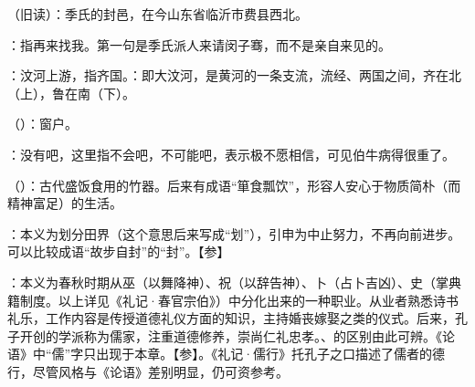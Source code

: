 {
\item {}（旧读）：季氏的封邑，在今山东省临沂市费县西北。%
\item {}：指再来找我。第一句是季氏派人来请闵子骞，而不是亲自来见的。

\item {}：汶河上游，指齐国。：即大汶河，是黄河的一条支流，流经、两国之间，齐在北（上），鲁在南（下）。
}
{}


{
\item {}（）：窗户。
\item {}：没有吧，这里指不会吧，不可能吧，表示极不愿相信，可见伯牛病得很重了。
}
{}


{
\item {}（）：古代盛饭食用的竹器。后来有成语“箪食瓢饮”，形容人安心于物质简朴（而精神富足）的生活。%
}
{}


{
\item {}：本义为划分田界（这个意思后来写成“划”），引申为中止努力，不再向前进步。可以比较成语“故步自封”的“封”。【参】
}
{}  %


{
\item {}：本义为春秋时期从巫（以舞降神）、祝（以辞告神）、卜（占卜吉凶）、史（掌典籍制度。以上详见《礼记·春官宗伯》）中分化出来的一种职业。从业者熟悉诗书礼乐，工作内容是传授道德礼仪方面的知识，主持婚丧嫁娶之类的仪式。后来，孔子开创的学派称为儒家，注重道德修养，崇尚仁礼忠孝。、的区别由此可辨。《论语》中“儒”字只出现于本章。【参】。《礼记·儒行》托孔子之口描述了儒者的德行，尽管风格与《论语》差别明显，仍可资参考。
}
{}


